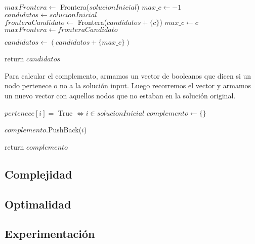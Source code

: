 
\begin{algorithm}[H]
\begin{algorithmic}

    \State $maxFrontera \gets$ Frontera($solucionInicial$)
    \State $max\_c \gets -1$
    \State $candidatos \gets solucionInicial$  \\

            \State $fronteraCandidato \gets$ Frontera($candidatos + \{c\}$)
                \State $max\_c \gets c$
                \State $maxFrontera \gets fronteraCandidato$ \\
            \EndIf
        \EndIf
    \EndFor

        \State $candidatos \gets (candidatos + \{max\_c\})$
    \EndIf

    \State return $candidatos$

\EndFunction
\end{algorithmic}
\end{algorithm}

Para calcular el complemento, armamos un vector de booleanos que dicen si un nodo pertenece o no a la solución input. Luego recorremos el vector y armamos un nuevo vector con aquellos nodos que no estaban en la solución original.

\begin{algorithm}[H]
\begin{algorithmic}
    \State $pertenece[i] =$ True $\iff i \in solucionInicial$
    \State $complemento \gets \{\}$

    \For{$i \in [0..n)$}
            \State $complemento$.PushBack($i$)
        \EndIf
    \EndFor

    \State return $complemento$

\EndFunction
\end{algorithmic}
\end{algorithm}


\subsection{Complejidad}


\subsection{Optimalidad}

\subsection{Experimentación}
